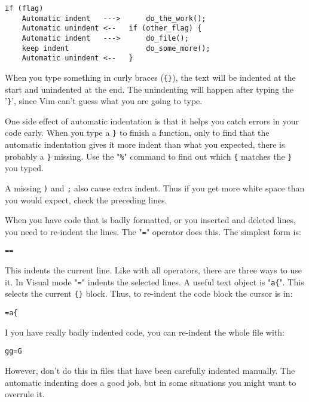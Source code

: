\begin{Verbatim}[samepage=true]
                             if (flag)
    Automatic indent   --->      do_the_work();
    Automatic unindent <--   if (other_flag) {
    Automatic indent   --->      do_file();
    keep indent                  do_some_more();
    Automatic unindent <--   }
\end{Verbatim}

When you type something in curly braces (\verb!{}!), the text will be indented at the start and unindented at the end.
The unindenting will happen after typing the '\verb!}!', since Vim can't guess what you are going to type.

One side effect of automatic indentation is that it helps you catch errors in your code early.
When you type a \verb!}! to finish a function, only to find that the automatic indentation gives it more indent than what you expected, there is probably a \verb!}! missing.
Use the "\verb!%!" command to find out which \verb!{! matches the \verb!}! you typed.

A missing \verb!)! and \verb!;! also cause extra indent.
Thus if you get more white space than you would expect, check the preceding lines.

When you have code that is badly formatted, or you inserted and deleted lines, you need to re-indent the lines.
The "\verb!=!" operator does this.
The simplest form is:

\begin{Verbatim}[samepage=true]
 ==
\end{Verbatim}

This indents the current line.
Like with all operators, there are three ways to use it.
In Visual mode "\verb!=!" indents the selected lines.
A useful text object is "\verb!a{!".
This selects the current \verb!{}! block.
Thus, to re-indent the code block the cursor is in:

\begin{Verbatim}[samepage=true]
 =a{
\end{Verbatim}

I you have really badly indented code, you can re-indent the whole file with:

\begin{Verbatim}[samepage=true]
 gg=G
\end{Verbatim}

However, don't do this in files that have been carefully indented manually.
The automatic indenting does a good job, but in some situations you might want to overrule it.
